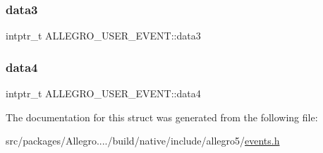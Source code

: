 \subsubsection{\texorpdfstring{data3}{data3}}
{\footnotesize\ttfamily intptr\+\_\+t A\+L\+L\+E\+G\+R\+O\+\_\+\+U\+S\+E\+R\+\_\+\+E\+V\+E\+N\+T\+::data3}

\mbox{\label{struct_a_l_l_e_g_r_o___u_s_e_r___e_v_e_n_t_ad6ff01a2ccdf261c0863b694737c5323}} 
\subsubsection{\texorpdfstring{data4}{data4}}
{\footnotesize\ttfamily intptr\+\_\+t A\+L\+L\+E\+G\+R\+O\+\_\+\+U\+S\+E\+R\+\_\+\+E\+V\+E\+N\+T\+::data4}



The documentation for this struct was generated from the following file\+:\begin{DoxyCompactItemize}
\item 
src/packages/\+Allegro..../build/native/include/allegro5/\hyperlink{events_8h}{events.\+h}\end{DoxyCompactItemize}
